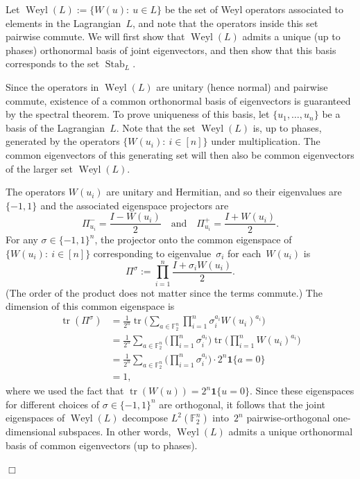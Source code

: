 \documentclass[11pt]{amsart}
\DeclareMathOperator{\Stab}{Stab}\DeclareMathOperator{\Spec}{Spec}
\newcommand{\F}{\mathbb{F}} %
\newcommand{\pmset}[1]{\{-1,1\}^{#1}} %
\newcommand{\one}{\mathbf{1}}
\DeclareMathOperator{\tr}{tr}
\DeclareMathOperator{\Weyl}{Weyl}
\theoremstyle{plain}
\theoremstyle{definition}
\theoremstyle{remark}
\renewenvironment{proof}[1][]{
    	\begin{trivlist}
     	\item[\hspace{\labelsep}{\em\noindent Proof#1:\/}]}
     	{{\hfill$\Box$}
    	\end{trivlist}
  }
\begin{document}
\begin{proof}
Let $\Weyl(L) := \{W(u):\: u\in L\}$ be the set of Weyl operators associated to elements in the Lagrangian~$L$, and note that the operators inside this set pairwise commute.
We will first show that $\Weyl(L)$ admits a unique (up to phases) orthonormal basis of joint eigenvectors, and then show that this basis corresponds to the set $\Stab_L$.

Since the operators in $\Weyl(L)$ are unitary (hence normal) and pairwise commute, existence of a common orthonormal basis of eigenvectors is guaranteed by the spectral theorem.
To prove uniqueness of this basis, let $\{u_1, \dots, u_n\}$ be a basis of the Lagrangian~$L$.
Note that the set $\Weyl(L)$ is, up to phases, generated by the operators $\{W(u_i):\: i\in [n]\}$ under multiplication.
The common eigenvectors of this generating set will then also be common eigenvectors of the larger set $\Weyl(L)$.

The operators $W(u_i)$ are unitary and Hermitian, and so their eigenvalues are $\pmset{}$ and the associated eigenspace projectors are
$$\Pi_{u_i}^{-} = \frac{I-W(u_i)}{2} \quad \text{and} \quad \Pi_{u_i}^{+} = \frac{I+W(u_i)}{2}.$$
For any $\sigma\in \pmset{n}$, the projector onto the common eigenspace of $\{W(u_i):\: i\in [n]\}$ corresponding to eigenvalue~$\sigma_i$ for each~$W(u_i)$ is
$$\Pi^{\sigma} := \prod_{i=1}^n \frac{I + \sigma_i W(u_i)}{2}.$$
(The order of the product does not matter since the terms commute.)
The dimension of this common eigenspace is
\begin{align*}
    \tr(\Pi^{\sigma})
    &= \frac{1}{2^n} \tr\bigg(\sum_{a\in \F_2^n} \prod_{i=1}^n \sigma_i^{a_i} W(u_i)^{a_i} \bigg) \\
    &= \frac{1}{2^n} \sum_{a\in \F_2^n} \bigg(\prod_{i=1}^n \sigma_i^{a_i}\bigg) \tr\bigg( \prod_{i=1}^n W(u_i)^{a_i} \bigg) \\
    &= \frac{1}{2^n} \sum_{a\in \F_2^n} \bigg(\prod_{i=1}^n \sigma_i^{a_i}\bigg) \cdot 2^n \one\{a=0\} \\
    &= 1,
\end{align*}
where we used the fact that $\tr(W(u)) = 2^n \one\{u=0\}$.
Since these eigenspaces for different choices of $\sigma\in \pmset{n}$ are orthogonal, it follows that the joint eigenspaces of $\Weyl(L)$ decompose $L^2(\F_2^n)$ into~$2^n$ pairwise-orthogonal one-dimensional subspaces.
In other words, $\Weyl(L)$ admits a unique orthonormal basis of common eigenvectors (up to phases).


\end{proof}
\end{document}
